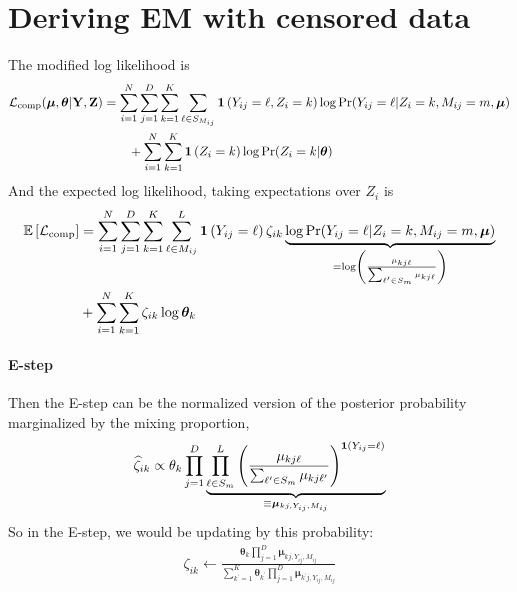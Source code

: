 \documentclass[11pt]{article}
\begin{document}
\section{Deriving EM with censored data}

The modified log likelihood is
\begin{align}
\mathcal{L}_{\text{comp}}(\bm{\mu}, \bm{\theta}|\mathbf{Y}, \mathbf{Z}) & = \sum^{N}_{i=1}\sum^{D}_{j=1}\sum^{K}_{k=1}\sum^{}_{\ell \in S_{M_{ij}}}
\bm{1}\left(Y_{ij} = \ell, Z_{i} = k\right)
\log \Pr(Y_{ij} = \ell | Z_{i} = k,  M_{ij} = m, \bm{\mu})\nonumber\\
& \qquad +
\sum^N_{i=1}\sum^{K}_{k=1}\bm{1}\left(Z_{i} = k\right)\log \Pr(Z_{i} = k | \bm{\theta})\nonumber
\end{align}
And the expected log likelihood, taking expectations over \(Z_i\) is 
\begin{align}
\mathbb{E}\left[\mathcal{L}_{\text{comp}}\right] &= \sum^{N}_{i=1}\sum^{D}_{j=1}\sum^{K}_{k=1}\sum^{L}_{\ell \in M_{ij}}\bm{1}\left(Y_{ij} = \ell\right)\zeta_{ik}\underbrace{\log \Pr(Y_{ij} = \ell | Z_{i} = k, M_{ij} = m, \bm{\mu})}_{=\log \left(\frac{\mu_{kj\ell}}{\sum_{\ell^\prime \in S_{m}} \mu_{kj\ell}}\right)}\nonumber\\
& + \sum^{N}_{i=1}\sum^{K}_{k=1}\zeta_{ik}\log \bm{\theta}_{k}
\end{align}

\paragraph{E-step} Then the E-step can be the normalized version of the posterior probability marginalized by the mixing proportion,
\begin{align}
\widehat{\zeta}_{ik} \propto \theta_k\prod^{D}_{j = 1}\underbrace{\prod^{L}_{\ell \in S_m}\left(\frac{\mu_{kj\ell}}{\sum_{\ell^\prime \in S_{m}} \mu_{kj\ell^\prime}}\right)^{\bm{1}\left(Y_{ij} = \ell\right)}}_{\equiv \bm{\mu}_{kj, Y_{ij}, M_{ij}}}
\end{align}
So in the E-step, we would be updating by this probability:
\begin{align}
\zeta_{ik} \leftarrow \frac{\bm{\theta}_{k}\prod^{D}_{j=1}\bm{\mu}_{kj,Y_{ij}, M_{ij}}}
{\sum^{K}_{k^\prime=1}\bm{\theta}_{k^\prime}\prod^{D}_{j=1}\bm{\mu}_{k^\prime j,Y_{ij}, M_{ij}}}
\end{align}
\end{document}
